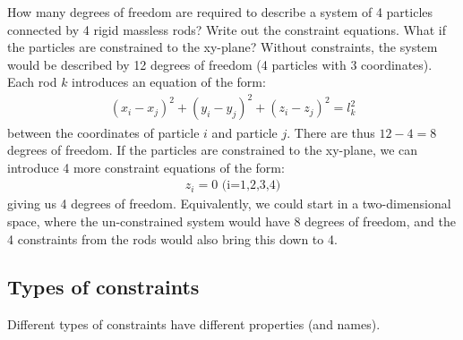 \begin{example}{0pt}{How many degrees of freedom are required to describe a system of 4 particles connected by 4 rigid massless rods? Write out the constraint equations. What if the particles are constrained to the xy-plane? }{}
Without constraints, the system would be described by 12 degrees of freedom (4 particles with 3 coordinates). Each rod $k$ introduces an equation of the form:
\begin{align*}
(x_i-x_j)^2+(y_i-y_j)^2+(z_i-z_j)^2=l_k^2
\end{align*}
between the coordinates of particle $i$ and particle $j$. There are thus $12-4=8$ degrees of freedom. If the particles are constrained to the xy-plane, we can introduce 4 more constraint equations of the form:
\begin{align*}
z_i=0\text{			(i=1,2,3,4)}
\end{align*}
giving us 4 degrees of freedom. Equivalently, we could start in a two-dimensional space, where the un-constrained system would have 8 degrees of freedom, and the 4 constraints from the rods would also bring this down to 4.
\label{ex:4MassesAndRod}
\end{example}

\subsection{Types of constraints}
Different types of constraints have different properties (and names). 
